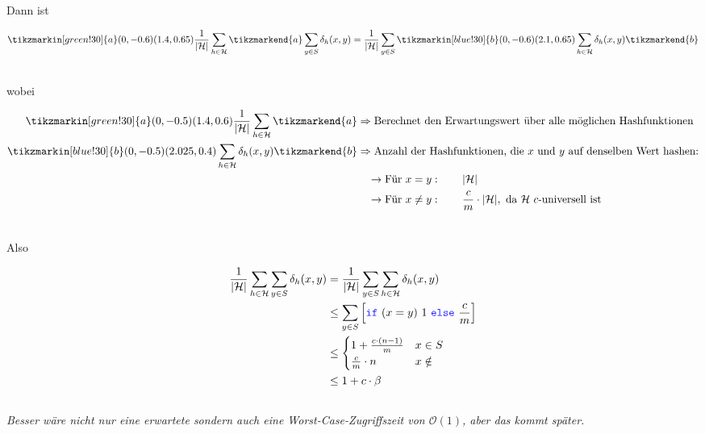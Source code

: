 \documentclass{scrartcl}%
\begin{document}
    Dann ist

    \begin{equation*}
        \begin{align*}
            \tikzmarkin[green!30]{a}(0,-0.6)(1.4,0.65) \frac{1}{|\mathcal{H}|} \sum_{h \in \mathcal{H}}\tikzmarkend{a}
            \sum_{y \in S}\delta_h(x,y) &= \frac{1}{|\mathcal{H}|}\sum_{y \in S} \tikzmarkin[blue!30]{b}(0,-0.6)(2.1,0.65)\sum_{h \in \mathcal{H}}\delta_h(x,y)\tikzmarkend{b} \\\nonumber
        \end{align*}
    \end{equation*}

    wobei

    \begin{equation*}
        \begin{align*}
            \tikzmarkin[green!30]{a}(0,-0.5)(1.4,0.6) \frac{1}{|\mathcal{H}|} \sum_{h \in \mathcal{H}}\tikzmarkend{a}
            &\Rightarrow \text{Berechnet den Erwartungswert über alle möglichen Hashfunktionen}  \\\nonumber
            \tikzmarkin[blue!30]{b}(0,-0.5)(2.025,0.4)\sum_{h \in \mathcal{H}}\delta_h(x,y)\tikzmarkend{b}
            &\Rightarrow \text{Anzahl der Hashfunktionen, die $x$ und $y$ auf denselben Wert hashen:} \\\nonumber
            & \phantom{\Rightarrow} \rightarrow \text{Für } x = y: \qquad |\mathcal{H}|\\\nonumber
            & \phantom{\Rightarrow} \rightarrow \text{Für } x \neq y: \qquad \frac{c}{m} \cdot |\mathcal{H}|,
            \text{ da $\mathcal{H}\ c$-universell ist }\\\nonumber
        \end{align*}
    \end{equation*}

    Also

    \begin{equation*}
        \begin{align*}
            \frac{1}{|\mathcal{H}|} \sum_{h \in \mathcal{H}} \sum_{y \in S}\delta_h(x,y) &= \frac{1}{|\mathcal{H}|}\sum_{y \in S} \sum_{h \in \mathcal{H}}\delta_h(x,y) \\\nonumber
            & \leq \sum_{y \in S}\left[\text{\texttt{\textcolor{listingBlue}{if}} $(x=y)$ $1$ \texttt{\textcolor{listingBlue}{else}} } \frac{c}{m}\right] \\\nonumber
            & \leq \begin{cases}
                       1 + \frac{c \cdot (n-1)}{m} & x \in S \\
                       \frac{c}{m} \cdot n & x \notin
            \end{cases} \\\nonumber
            & \leq 1 + c \cdot \beta \\\nonumber
        \end{align*}
    \end{equation*}
    \textit{Besser wäre nicht nur eine erwartete sondern auch eine Worst-Case-Zugriffszeit von $\mathcal{O}(1)$, aber das kommt später.}
    \proofend
\end{document}
